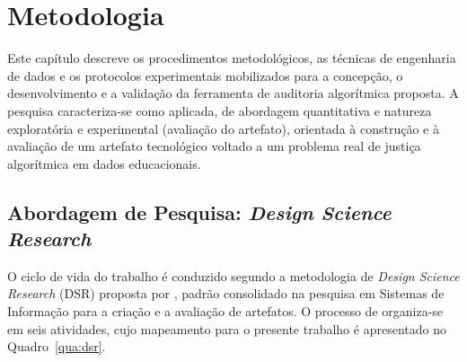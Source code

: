 \chapter{Metodologia}
\label{cap:metodologia}

Este capítulo descreve os procedimentos metodológicos, as técnicas de engenharia de dados e os protocolos experimentais mobilizados para a concepção, o desenvolvimento e a validação da ferramenta de auditoria algorítmica proposta. A pesquisa caracteriza-se como aplicada, de abordagem quantitativa e natureza exploratória e experimental (avaliação do artefato), orientada à construção e à avaliação de um artefato tecnológico voltado a um problema real de justiça algorítmica em dados educacionais.

\section{Abordagem de Pesquisa: \textit{Design Science Research}}
\label{sec:dsr}

O ciclo de vida do trabalho é conduzido segundo a metodologia de \textit{Design Science Research} (DSR) proposta por , padrão consolidado na pesquisa em Sistemas de Informação para a criação e a avaliação de artefatos. O processo de  organiza-se em seis atividades, cujo mapeamento para o presente trabalho é apresentado no Quadro~\ref{qua:dsr}.

